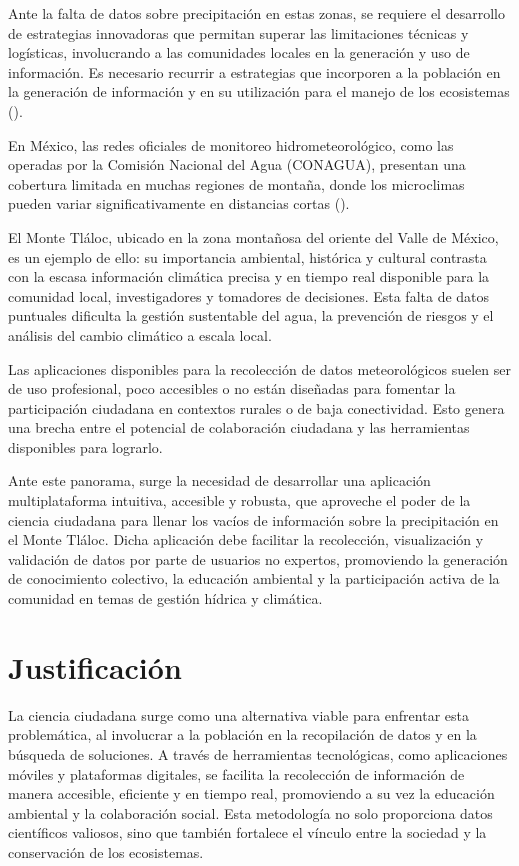 Ante la falta de datos sobre precipitación en estas zonas, se requiere el desarrollo de estrategias innovadoras que permitan superar las limitaciones técnicas y logísticas, involucrando a las comunidades locales en la generación y uso de información. Es necesario recurrir a estrategias que incorporen a la población en la generación de información y en su utilización para el manejo de los ecosistemas (\cite{hubp1990}).


En México, las redes oficiales de monitoreo hidrometeorológico, como las operadas por la Comisión Nacional del Agua (CONAGUA), presentan una cobertura limitada en muchas regiones de montaña, donde los microclimas pueden variar significativamente en distancias cortas (\cite{rosas2021}).


El Monte Tláloc, ubicado en la zona montañosa del oriente del Valle de México, es un ejemplo de ello: su importancia ambiental, histórica y cultural contrasta con la escasa información climática precisa y en tiempo real disponible para la comunidad local, investigadores y tomadores de decisiones. Esta falta de datos puntuales dificulta la gestión sustentable del agua, la prevención de riesgos y el análisis del cambio climático a escala local.

Las aplicaciones disponibles para la recolección de datos meteorológicos suelen ser de uso profesional, poco accesibles o no están diseñadas para fomentar la participación ciudadana en contextos rurales o de baja conectividad. Esto genera una brecha entre el potencial de colaboración ciudadana y las herramientas disponibles para lograrlo.

Ante este panorama, surge la necesidad de desarrollar una aplicación multiplataforma intuitiva, accesible y robusta, que aproveche el poder de la ciencia ciudadana para llenar los vacíos de información sobre la precipitación en el Monte Tláloc. Dicha aplicación debe facilitar la recolección, visualización y validación de datos por parte de usuarios no expertos, promoviendo la generación de conocimiento colectivo, la educación ambiental y la participación activa de la comunidad en temas de gestión hídrica y climática.



\section{Justificación}


La ciencia ciudadana surge como una alternativa viable para enfrentar esta problemática, al involucrar a la población en la recopilación de datos y en la búsqueda de soluciones. A través de herramientas tecnológicas, como aplicaciones móviles y plataformas digitales, se facilita la recolección de información de manera accesible, eficiente y en tiempo real, promoviendo a su vez la educación ambiental y la colaboración social. Esta metodología no solo proporciona datos científicos valiosos, sino que también fortalece el vínculo entre la sociedad y la conservación de los ecosistemas.

